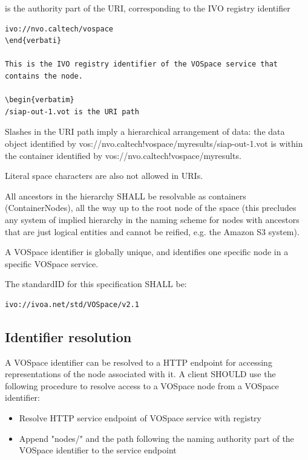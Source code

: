 \documentclass[11pt,a4paper]{ivoa}
\begin{document}
is the authority part of the URI, corresponding to the IVO registry identifier

\begin{verbatim}
ivo://nvo.caltech/vospace
\end{verbati}

This is the IVO registry identifier of the VOSpace service that contains the node.

\begin{verbatim}
/siap-out-1.vot is the URI path
\end{verbatim}

Slashes in the URI path imply a hierarchical arrangement of data: the data object identified by vos://nvo.caltech!vospace/myresults/siap-out-1.vot is within the container identified by vos://nvo.caltech!vospace/myresults.

Literal space characters are also not allowed in URIs.

All ancestors in the hierarchy SHALL be resolvable as containers (ContainerNodes), all the way up to the root node of the space (this precludes any system of implied hierarchy in the naming scheme for nodes with ancestors that are just logical entities and cannot be reified, e.g. the Amazon S3 system).

A VOSpace identifier is globally unique, and identifies one specific node in a specific VOSpace service.

The standardID for this specification SHALL be:
\begin{verbatim}
ivo://ivoa.net/std/VOSpace/v2.1
\end{verbatim}

\subsection{Identifier resolution}
\label{subsec:identifier resolution}
A VOSpace identifier can be resolved to a HTTP endpoint for accessing representations of the node associated with it. A client SHOULD use the following procedure to resolve access to a VOSpace node from a VOSpace identifier:

\begin{itemize}
    \item Resolve HTTP service endpoint of VOSpace service with registry
    \item Append "nodes/" and the path following the naming authority part of the VOSpace identifier to the service endpoint
\end{itemize}
\end{document}
